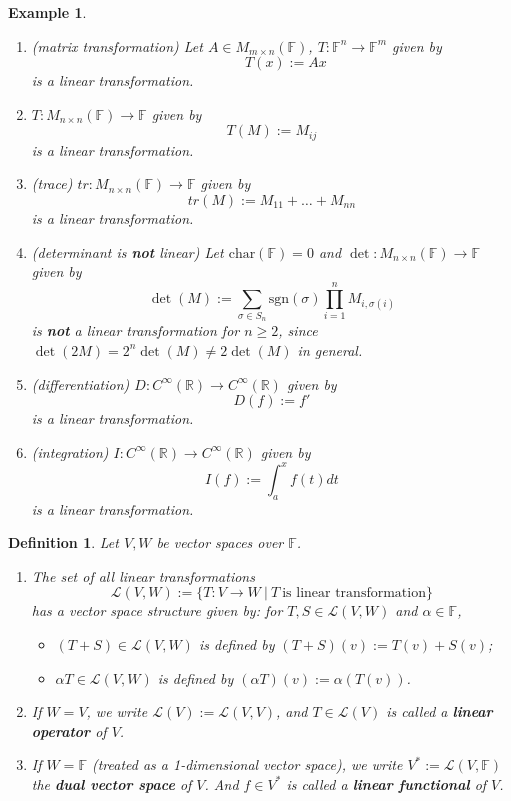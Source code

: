 \documentclass[12pt]{amsbook}
\newtheorem{definition}[theorem]{Definition}
\newtheorem{example}[theorem]{Example}
\begin{document}
\begin{example} \label{eg-lineartrans} \
    \begin{enumerate}
        \item (matrix transformation) Let $A \in M_{m \times n}(\mathbb{F})$, $T: \mathbb{F}^n \to \mathbb{F}^m$ given by 
        $$\quad \quad T(x) := Ax$$
        is a linear transformation.
        \item $T: M_{n \times n}(\mathbb{F}) \to \mathbb{F}$ given by 
        $$T(M) := M_{ij}$$ 
        is a linear transformation.
        \item (trace) $tr: M_{n \times n}(\mathbb{F}) \to \mathbb{F}$ given by 
        $$tr(M) := M_{11}+\dots + M_{nn}$$ 
        is a linear transformation.
        \item (determinant is {\bf not} linear) Let $\mathrm{char}(\mathbb{F}) = 0$ and $\det: M_{n \times n}(\mathbb{F}) \to \mathbb{F}$ given by 
        $$\det(M) := \sum_{\sigma \in S_n} \mathrm{sgn}(\sigma) \prod_{i=1}^n M_{i,\sigma(i)}$$ 
        is {\bf not} a linear transformation for $n \geq 2$, since
        $\det(2M) = 2^n\det(M) \neq 2\det(M)$ in general.
        \item (differentiation) $D: C^{\infty}(\mathbb{R}) \to C^{\infty}(\mathbb{R})$ given by 
        $$D(f) := f'$$ 
        is a linear transformation.
        \item (integration) $I: C^{\infty}(\mathbb{R}) \to C^{\infty}(\mathbb{R})$ given by 
        $$I(f) := \int_{a}^{x} f(t)dt$$ 
        is a linear transformation.
    \end{enumerate}
\end{example}

\begin{definition}
    Let $V, W$ be vector spaces over $\mathbb{F}$.
\begin{enumerate}
    \item The set of all linear transformations 
    $$\mathcal{L}(V,W) := \{T:V \to W\ |\ T\ \text{is linear transformation}\}$$
    has a vector space structure given by: for $T,S \in \mathcal{L}(V,W)$ and $\alpha \in \mathbb{F}$,
    \begin{itemize}
        \item $(T+S) \in \mathcal{L}(V,W)$ is defined by $(T+S)(v) := T(v) + S(v)$;
        \item $\alpha T \in \mathcal{L}(V,W)$ is defined by $(\alpha T)(v) := \alpha(T(v))$.
        \end{itemize}
    \item If $W = V$, we write $\mathcal{L}(V) := \mathcal{L}(V,V)$, and $T \in \mathcal{L}(V)$ is called a {\bf linear operator} of $V$.
    \item If $W = \mathbb{F}$ (treated as a 1-dimensional vector space), we write $V^* := \mathcal{L}(V,\mathbb{F})$ the {\bf dual vector space} of $V$. And $f \in V^*$ is called a {\bf linear functional} of $V$.
\end{enumerate} 
\end{definition}
\end{document}

